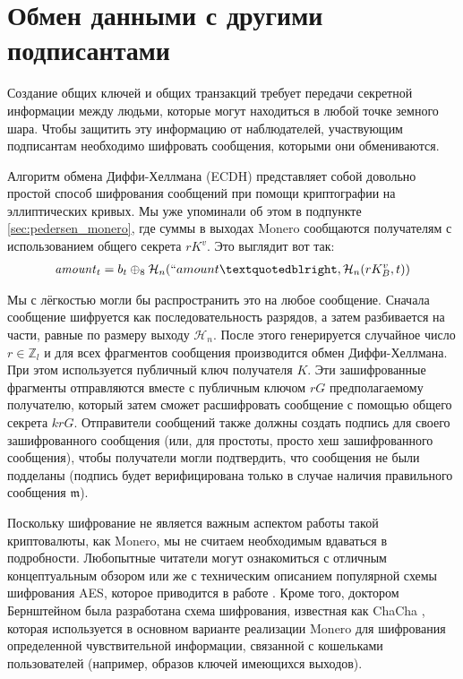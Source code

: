 \section{Обмен данными с другими подписантами}
\label{sec:communicating}

Создание общих ключей и общих транзакций требует передачи секретной информации между людьми, которые могут находиться в любой точке земного шара. Чтобы защитить эту информацию от наблюдателей, участвующим подписантам необходимо шифровать сообщения, которыми они обмениваются.

Алгоритм обмена Диффи-Хеллмана (ECDH) представляет собой довольно простой способ шифрования сообщений при помощи криптографии на эллиптических кривых. Мы уже упоминали об этом в подпункте \ref{sec:pedersen_monero}, где суммы в выходах Monero сообщаются получателям с использованием общего секрета $r K^v$. Это выглядит вот так:\vspace{.175cm}
\begin{align*}
  \mathit{amount}_t = b_t \oplus_8 \mathcal{H}_n(``amount”, \mathcal{H}_n(r K_B^v, t))
\end{align*}

Мы с лёгкостью могли бы распространить это на любое сообщение. Сначала сообщение шифруется как последовательность разрядов, а затем разбивается на части, равные по разме\-ру выходу $\mathcal{H}_n$. После этого генерируется случайное число $r \in \mathbb{Z}_l$ и для всех фрагментов сообщения производится обмен Диффи-Хеллмана. При этом используется публичный ключ получателя $K$. Эти зашифрованные фрагменты отправляются вместе с публичным ключом $r G$ предполагаемому получателю, который затем сможет расшифровать сообщение с помощью общего секрета $k r G$. Отправители сообщений также должны создать подпись для своего зашифрованного сообщения (или, для простоты, просто хеш зашифрованного сообщения), чтобы получатели могли подтвердить, что сообщения не были подделаны (подпись будет верифицирована только в случае наличия правильного сообщения $\mathfrak{m}$).

Поскольку шифрование не является важным аспектом работы такой криптовалюты, как Monero, мы не считаем необходимым вдаваться в подробности. Любопытные читатели могут ознакомиться с отличным концептуальным обзором \cite{tutorialspoint-cryptography} или же с техническим описанием популярной схемы шифрования AES, которое приводится в работе \cite{AES-encryption}. Кроме того, доктором Бернштейном была разработана схема шифрования, известная как ChaCha \cite{Bernstein_chacha,chacha-irtf}, которая используется в основном варианте реализации Monero для шифрования определенной чув\-ствительной информации, связанной с кошельками пользователей (например, образов ключей имеющихся выходов).



